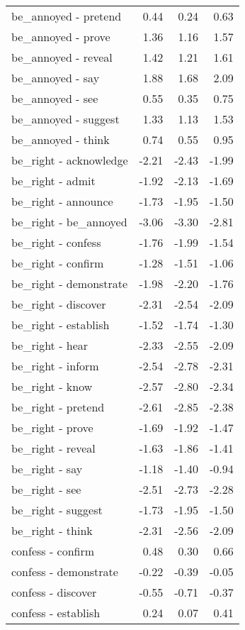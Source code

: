 \begin{longtable}{lrrr}
  be_annoyed - pretend & 0.44 & 0.24 & 0.63 \\ 
  be_annoyed - prove & 1.36 & 1.16 & 1.57 \\ 
  be_annoyed - reveal & 1.42 & 1.21 & 1.61 \\ 
  be_annoyed - say & 1.88 & 1.68 & 2.09 \\ 
  be_annoyed - see & 0.55 & 0.35 & 0.75 \\ 
  be_annoyed - suggest & 1.33 & 1.13 & 1.53 \\ 
  be_annoyed - think & 0.74 & 0.55 & 0.95 \\ 
  be_right - acknowledge & -2.21 & -2.43 & -1.99 \\ 
  be_right - admit & -1.92 & -2.13 & -1.69 \\ 
  be_right - announce & -1.73 & -1.95 & -1.50 \\ 
  be_right - be_annoyed & -3.06 & -3.30 & -2.81 \\ 
  be_right - confess & -1.76 & -1.99 & -1.54 \\ 
  be_right - confirm & -1.28 & -1.51 & -1.06 \\ 
  be_right - demonstrate & -1.98 & -2.20 & -1.76 \\ 
  be_right - discover & -2.31 & -2.54 & -2.09 \\ 
  be_right - establish & -1.52 & -1.74 & -1.30 \\ 
  be_right - hear & -2.33 & -2.55 & -2.09 \\ 
  be_right - inform & -2.54 & -2.78 & -2.31 \\ 
  be_right - know & -2.57 & -2.80 & -2.34 \\ 
  be_right - pretend & -2.61 & -2.85 & -2.38 \\ 
  be_right - prove & -1.69 & -1.92 & -1.47 \\ 
  be_right - reveal & -1.63 & -1.86 & -1.41 \\ 
  be_right - say & -1.18 & -1.40 & -0.94 \\ 
  be_right - see & -2.51 & -2.73 & -2.28 \\ 
  be_right - suggest & -1.73 & -1.95 & -1.50 \\ 
  be_right - think & -2.31 & -2.56 & -2.09 \\ 
  confess - confirm & 0.48 & 0.30 & 0.66 \\ 
  confess - demonstrate & -0.22 & -0.39 & -0.05 \\ 
  confess - discover & -0.55 & -0.71 & -0.37 \\ 
  confess - establish & 0.24 & 0.07 & 0.41 \\ 

\end{longtable}
